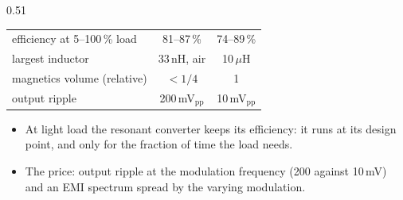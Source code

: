 \begin{frame}
\begin{columns}[T]
\begin{column}{0.51\textwidth}
\begin{table}
\begin{tabular}{|l|c|c|}
					efficiency at 5--100\,\% load & 81--87\,\%             & 74--89\,\%             \\
					largest inductor            & 33\,nH, air              & 10\,$\mu$H             \\
					magnetics volume (relative) & $<1/4$                   & 1                      \\
					output ripple               & 200\,mV$_\mathrm{pp}$    & 10\,mV$_\mathrm{pp}$   \\
					\hline
				\end{tabular}
			\end{table}
			\vspace{-0.3cm}
			\begin{itemize}
				\item At light load the resonant converter keeps its efficiency: it runs at its design point, and only for the fraction of time the load needs.
				\item The price: output ripple at the modulation frequency (200 against 10\,mV) and an EMI spectrum spread by the varying modulation.
			\end{itemize}
		\end{column}
	\end{columns}
\end{frame}

